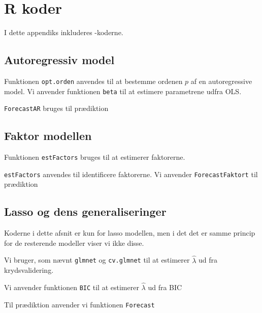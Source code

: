 \chapter{R koder} \label{app:r_koder}
I dette appendiks inkluderes \Rlang-koderne. 

\section{Autoregressiv model} \label{sec:auto}
Funktionen \texttt{opt.orden} anvendes til at bestemme ordenen $p$ af en autoregressive model.  
%
Vi anvender funktionen \texttt{beta} til at estimere parametrene udfra OLS. 

\texttt{ForecastAR} bruges til prædiktion

\section{Faktor modellen} \label{sec:faktor}
Funktionen \texttt{estFactors} bruges til at estimerer faktorerne.

\texttt{estFactors} anvendes til identificere faktorerne. 
%
%
Vi anvender \texttt{ForecastFaktort} til prædiktion

\section{Lasso og dens generaliseringer} \label{sec:lasso}
Koderne i dette afsnit er kun for lasso modellen, men i det det er samme princip for de resterende modeller viser vi ikke disse. 

Vi bruger, som nævnt \texttt{glmnet} og \texttt{cv.glmnet} til at estimerer $\widehat{\lambda}$ ud fra krydsvalidering. 

Vi anvender funktionen \texttt{BIC} til at estimerer $\widehat{\lambda}$ ud fra  BIC

Til prædiktion anvender vi funktionen \texttt{Forecast} 


